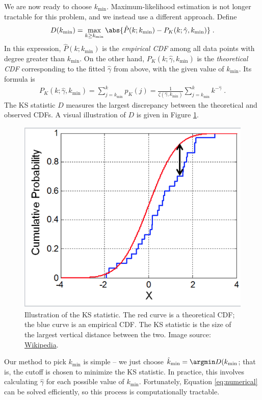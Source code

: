 \documentclass[english]{scrartcl}
\begin{document}
	We are now ready to choose $k_{\text{min}}$. Maximum-likelihood estimation is not longer tractable for this problem, and we instead use a different approach. Define 
	\begin{align}
		D(k_{\text{min}}) = \max_{k \geq k_{\text{min}}} \abs{\hat{P}(k; k_{\text{min}}) - P_K(k; \hat{\gamma}, k_{\text{min}})}\;. \label{eq:KS}
	\end{align}
	In this expression, $\hat{P}(k;  k_{\text{min}})$ is the \emph{empirical CDF} among all data points with degree greater than $k_{\text{min}}$. On the other hand, $P_K(k; \hat{\gamma}, k_{\text{min}})$ is the \emph{theoretical CDF} corresponding to the fitted $\hat{\gamma}$ from above, with the given value of $k_{\text{min}}$. Its formula is 
	\begin{align}
		P_K(k; \hat{\gamma}, k_{\text{min}}) = \sum_{j = k_{\text{min}}}^k p_K(j) =  \frac{1}{\zeta(\hat{\gamma}, k_{\text{min}})} \sum_{j = k_{\text{min}}}^k k^{-\hat{\gamma}}\;.
	\end{align}
	The KS statistic $D$ measures the largest discrepancy between the theoretical and observed CDFs. A visual illustration of $D$ is given in Figure \ref{fig:KS}.

	\begin{figure}
		\centering
		\includegraphics[width = .5\textwidth]{KS}
		\caption{Illustration of the KS statistic. The red curve is a theoretical CDF; the blue curve is an empirical CDF. The KS statistic is the size of the largest vertical distance between the two. Image source: \href{https://en.wikipedia.org/wiki/Kolmogorov-Smirnov\_test}{Wikipedia}.} \label{fig:KS}
	\end{figure}

	Our method to pick $k_{\text{min}}$ is simple -- we just choose $\hat{k}_{\text{min}} = \argmin D(k_{\text{min}}$; that is, the cutoff is chosen to minimize the KS statistic. In practice, this involves calculating $\hat{\gamma}$ for each possible value of $k_{\text{min}}$. Fortunately, Equation \eqref{eq:numerical} can be solved efficiently, so this process is computationally tractable. 
\end{document}
